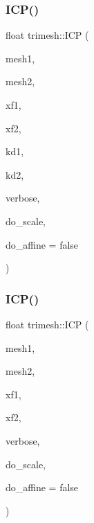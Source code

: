 \subsubsection{\texorpdfstring{I\+C\+P()}{ICP()}\hspace{0.1cm}{\footnotesize\ttfamily [5/7]}}
{\footnotesize\ttfamily float trimesh\+::\+I\+CP (\begin{DoxyParamCaption}\item[{\hyperlink{classtrimesh_1_1TriMesh}{Tri\+Mesh} $\ast$}]{mesh1,  }\item[{\hyperlink{classtrimesh_1_1TriMesh}{Tri\+Mesh} $\ast$}]{mesh2,  }\item[{const \hyperlink{namespacetrimesh_ad504958f2f56e393991b848986a8459f}{xform} \&}]{xf1,  }\item[{\hyperlink{namespacetrimesh_ad504958f2f56e393991b848986a8459f}{xform} \&}]{xf2,  }\item[{const \hyperlink{classtrimesh_1_1KDtree}{K\+Dtree} $\ast$}]{kd1,  }\item[{const \hyperlink{classtrimesh_1_1KDtree}{K\+Dtree} $\ast$}]{kd2,  }\item[{int}]{verbose,  }\item[{bool}]{do\+\_\+scale,  }\item[{bool}]{do\+\_\+affine = {\ttfamily false} }\end{DoxyParamCaption})}

\mbox{\label{namespacetrimesh_aa22c15523373c06e7a01a2243c1ab309}} 
\subsubsection{\texorpdfstring{I\+C\+P()}{ICP()}\hspace{0.1cm}{\footnotesize\ttfamily [6/7]}}
{\footnotesize\ttfamily float trimesh\+::\+I\+CP (\begin{DoxyParamCaption}\item[{\hyperlink{classtrimesh_1_1TriMesh}{Tri\+Mesh} $\ast$}]{mesh1,  }\item[{\hyperlink{classtrimesh_1_1TriMesh}{Tri\+Mesh} $\ast$}]{mesh2,  }\item[{const \hyperlink{namespacetrimesh_ad504958f2f56e393991b848986a8459f}{xform} \&}]{xf1,  }\item[{\hyperlink{namespacetrimesh_ad504958f2f56e393991b848986a8459f}{xform} \&}]{xf2,  }\item[{int}]{verbose,  }\item[{bool}]{do\+\_\+scale,  }\item[{bool}]{do\+\_\+affine = {\ttfamily false} }\end{DoxyParamCaption})}

